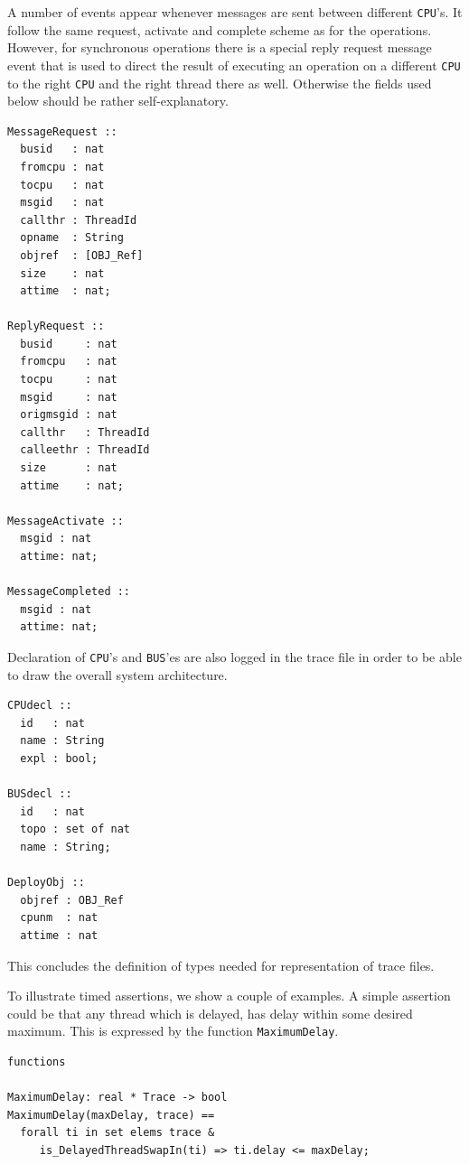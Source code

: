\documentclass{overturerepchap}
\begin{document}
A number of events appear whenever messages are sent between different 
\texttt{CPU}'s.
It follow the same request, activate and complete scheme as for the
operations. However, for synchronous operations there is a special reply
request message event that is used to direct the result of executing 
an operation on a different \texttt{CPU} to the right \texttt{CPU} and the
right thread there as well. Otherwise the fields used below should be rather
self-explanatory.

\begin{lstlisting}
MessageRequest ::
  busid   : nat
  fromcpu : nat
  tocpu   : nat
  msgid   : nat
  callthr : ThreadId
  opname  : String
  objref  : [OBJ_Ref]
  size    : nat
  attime  : nat;

ReplyRequest ::
  busid     : nat
  fromcpu   : nat
  tocpu     : nat
  msgid     : nat
  origmsgid : nat
  callthr   : ThreadId
  calleethr : ThreadId
  size      : nat
  attime    : nat;

MessageActivate ::
  msgid : nat
  attime: nat;

MessageCompleted ::
  msgid : nat
  attime: nat;
\end{lstlisting}

Declaration of \texttt{CPU}'s and \texttt{BUS}'es are also logged 
in the trace file in order to be able to draw the overall system architecture.

\begin{lstlisting}
CPUdecl ::
  id   : nat
  name : String
  expl : bool;
  
BUSdecl ::
  id   : nat
  topo : set of nat
  name : String;

DeployObj ::
  objref : OBJ_Ref
  cpunm  : nat
  attime : nat
\end{lstlisting}
 
This concludes the definition of types needed for representation of
trace files.

To illustrate timed assertions, we show a couple of examples. A simple
assertion could be that any thread which is delayed, has delay within
some desired maximum. This is expressed by the function
\texttt{MaximumDelay}.

\begin{lstlisting}
functions

MaximumDelay: real * Trace -> bool
MaximumDelay(maxDelay, trace) ==
  forall ti in set elems trace &
     is_DelayedThreadSwapIn(ti) => ti.delay <= maxDelay;
\end{lstlisting}
\end{document}
